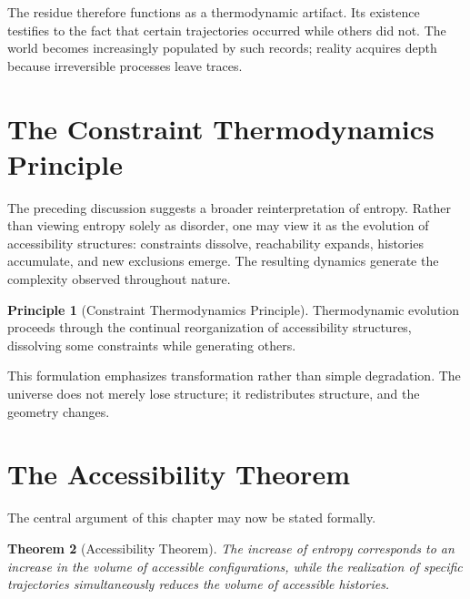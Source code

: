 \documentclass[11pt,oneside]{book}
\theoremstyle{plain}
\newtheorem{theorem}{Theorem}[chapter]
\theoremstyle{definition}
\newtheorem{principle}[theorem]{Principle}
\theoremstyle{remark}
\begin{document}
The residue therefore functions as a thermodynamic artifact. Its existence testifies to the fact that certain trajectories occurred while others did not. The world becomes increasingly populated by such records; reality acquires depth because irreversible processes leave traces.

\section{The Constraint Thermodynamics Principle}

The preceding discussion suggests a broader reinterpretation of entropy. Rather than viewing entropy solely as disorder, one may view it as the evolution of accessibility structures: constraints dissolve, reachability expands, histories accumulate, and new exclusions emerge. The resulting dynamics generate the complexity observed throughout nature.

\begin{principle}[Constraint Thermodynamics Principle]
Thermodynamic evolution proceeds through the continual reorganization of accessibility structures, dissolving some constraints while generating others.
\end{principle}

This formulation emphasizes transformation rather than simple degradation. The universe does not merely lose structure; it redistributes structure, and the geometry changes.

\section{The Accessibility Theorem}

The central argument of this chapter may now be stated formally.

\begin{theorem}[Accessibility Theorem]
The increase of entropy corresponds to an increase in the volume of accessible configurations, while the realization of specific trajectories simultaneously reduces the volume of accessible histories.
\end{theorem}
\end{document}
